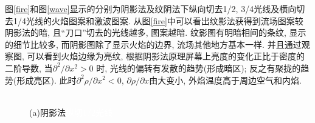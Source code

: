 \documentclass[12pt,a4paper,boxed,titlepage]{caspset}
\begin{document}
图\ref{fire}和图\ref{wave}显示的分别为阴影法及纹阴法下纵向切去1/2, 3/4光线及横向切去1/4光线的火焰图案和激波图案. 从图\ref{fire}中可以看出纹影法获得到流场图案较阴影法的暗, 且``刀口''切去的光线越多, 图案越暗.
纹影图有明暗相间的条纹, 显示的细节比较多, 而阴影图除了显示火焰的边界, 流场其他地方基本一样.
并且通过观察图, 可以看到火焰边缘为亮纹, 根据阴影法原理屏幕上亮度的变化正比于密度的二阶导数, 当$\partial^2/\partial x^2>0$
时, 光线的偏转有发散的趋势(形成暗区); 反之有聚拢的趋势(形成亮区).
此时$\partial^2\rho/\partial x^2 <0$, $\partial\rho/\partial x$由大变小, 外焰温度高于周边空气和内焰.
\begin{figure}[!htb]
\begin{minipage}[b]{.5\textwidth}
\centering
{}\\
(a)阴影法{\textcolor{white}{纵切1/2光线}}
\end{minipage}%
\begin{minipage}[b]{.5\textwidth}
\centering
{}\\

\end{minipage}
\end{figure}
\end{document}
